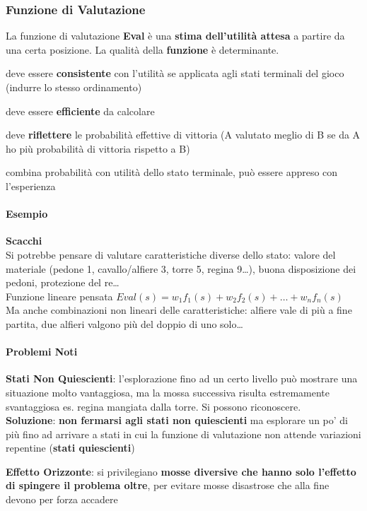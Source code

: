 \documentclass[10pt]{book}
\begin{document}
\subsubsection{Funzione di Valutazione}
La funzione di valutazione \textbf{Eval} è una \textbf{stima dell'utilità attesa} a partire da una certa posizione. La qualità della \textbf{funzione} è determinante.
\begin{list}{}{}
	\item deve essere \textbf{consistente} con l'utilità se applicata agli stati terminali del gioco (indurre lo stesso ordinamento)
	\item deve essere \textbf{efficiente} da calcolare
	\item deve \textbf{riflettere} le probabilità effettive di vittoria (A valutato meglio di B se da A ho più probabilità di vittoria rispetto a B)
	\item combina probabilità con utilità dello stato terminale, può essere appreso con l'esperienza
\end{list}
\paragraph{Esempio} \textbf{Scacchi}\\
Si potrebbe pensare di valutare caratteristiche diverse dello stato: valore del materiale (pedone 1, cavallo/alfiere 3, torre 5, regina 9\ldots), buona disposizione dei pedoni, protezione del re\ldots\\
Funzione lineare pensata $Eval(s) = w_1f_1(s) + w_2f_2(s) + \ldots + w_nf_n(s)$\\
Ma anche combinazioni non lineari delle caratteristiche: alfiere vale di più a fine partita, due alfieri valgono più del doppio di uno solo\ldots
\pagebreak
\paragraph{Problemi Noti}
\begin{list}{}{}
	\item \textbf{Stati Non Quiescienti}: l'esplorazione fino ad un certo livello può mostrare una situazione molto vantaggiosa, ma la mossa successiva risulta estremamente svantaggiosa es. regina mangiata dalla torre. Si possono riconoscere.\\
	\textbf{Soluzione}: \textbf{non fermarsi agli stati non quiescienti} ma esplorare un po' di più fino ad arrivare a stati in cui la funzione di valutazione non attende variazioni repentine (\textbf{stati quiescienti})
	\item \textbf{Effetto Orizzonte}: si privilegiano \textbf{mosse diversive che hanno solo l'effetto di spingere il problema oltre}, per evitare mosse disastrose che alla fine devono per forza accadere
\end{list}
\end{document}
